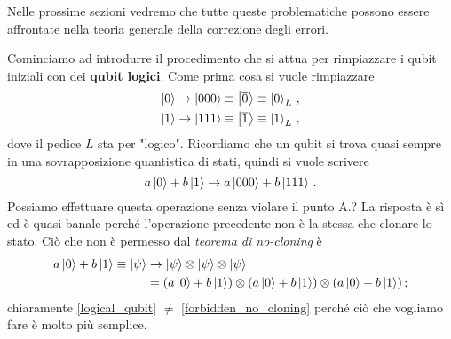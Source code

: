 \noindent Nelle prossime sezioni vedremo che tutte queste problematiche possono essere affrontate nella teoria generale della correzione degli errori. 

\noindent Cominciamo ad introdurre il procedimento che si attua per rimpiazzare i qubit iniziali con dei \textbf{qubit logici}. Come prima cosa si vuole rimpiazzare
\begin{align*}
    \ket{0} & \rightarrow \ket{000} \equiv \ket{\overline{0}} \equiv \ket{0}_L \, , \\
    \ket{1} & \rightarrow \ket{111} \equiv \ket{\overline{1}} \equiv \ket{1}_L \, ,
\end{align*}
dove il pedice $L$ sta per "logico". Ricordiamo che un qubit si trova quasi sempre in una sovrapposizione quantistica di stati, quindi si vuole scrivere
\begin{equation}\label{logical_qubit}
    a \ket{0} + b \ket{1} \to a \ket{000} + b \ket{111} \, .
\end{equation}
Possiamo effettuare questa operazione senza violare il punto A.? La risposta è sì ed è quasi banale perché l'operazione precedente non è la stessa che clonare lo stato. Ciò che non è permesso dal \textit{teorema di no-cloning} è \begin{align}\label{forbidden_no_cloning}
    a \ket{0} + b \ket{1} \equiv \ket{\psi} & \rightarrow \ket{\psi} \otimes \ket{\psi} \otimes \ket{\psi} \notag \\
    &= (a \ket{0} + b \ket{1}) \otimes (a \ket{0} + b \ket{1}) \otimes (a \ket{0} + b \ket{1}) \, ;
\end{align} 
chiaramente \eqref{logical_qubit} $\neq$ \eqref{forbidden_no_cloning} perché ciò che vogliamo fare è molto più semplice. 

